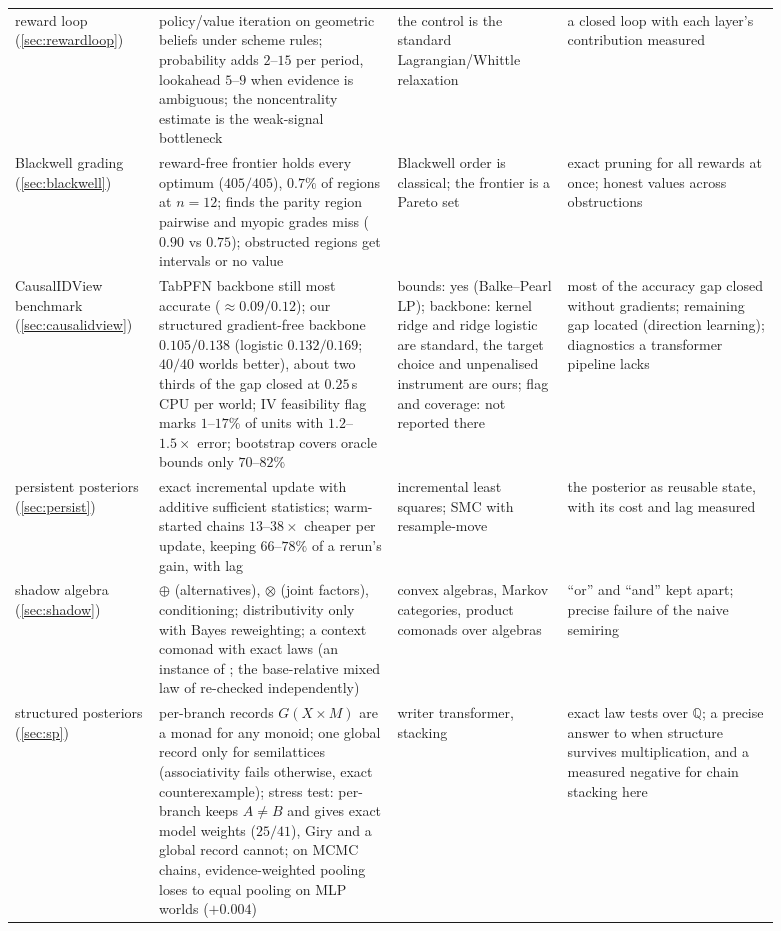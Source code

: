 \documentclass[11pt]{article}
\theoremstyle{definition}
\theoremstyle{remark}
\begin{document}
{\begin{longtable}{>{\raggedright\arraybackslash}p{0.15\linewidth}>{\raggedright\arraybackslash}p{0.29\linewidth}>{\raggedright\arraybackslash}p{0.2\linewidth}>{\raggedright\arraybackslash}p{0.25\linewidth}}
reward loop (\ref{sec:rewardloop}) & policy/value iteration on geometric beliefs under scheme rules; probability adds $2$--$15$ per period, lookahead $5$--$9$ when evidence is ambiguous; the noncentrality estimate is the weak-signal bottleneck & the control is the standard Lagrangian/Whittle relaxation & a closed loop with each layer's contribution measured\\
Blackwell grading (\ref{sec:blackwell}) & reward-free frontier holds every optimum ($405/405$), $0.7\%$ of regions at $n=12$; finds the parity region pairwise and myopic grades miss ($0.90$ vs $0.75$); obstructed regions get intervals or no value & Blackwell order is classical; the frontier is a Pareto set & exact pruning for all rewards at once; honest values across obstructions\\
CausalIDView benchmark (\ref{sec:causalidview}) & TabPFN backbone still most accurate ($\approx0.09/0.12$); our structured gradient-free backbone $0.105/0.138$ (logistic $0.132/0.169$; $40/40$ worlds better), about two thirds of the gap closed at $0.25$\,s CPU per world; IV feasibility flag marks $1$--$17\%$ of units with $1.2$--$1.5\times$ error; bootstrap covers oracle bounds only $70$--$82\%$ & bounds: yes (Balke--Pearl LP); backbone: kernel ridge and ridge logistic are standard, the target choice and unpenalised instrument are ours; flag and coverage: not reported there & most of the accuracy gap closed without gradients; remaining gap located (direction learning); diagnostics a transformer pipeline lacks\\
persistent posteriors (\ref{sec:persist}) & exact incremental update with additive sufficient statistics; warm-started chains $13$--$38\times$ cheaper per update, keeping $66$--$78\%$ of a rerun's gain, with lag & incremental least squares; SMC with resample-move & the posterior as reusable state, with its cost and lag measured\\
shadow algebra (\ref{sec:shadow}) & $\oplus$ (alternatives), $\otimes$ (joint factors), conditioning; distributivity only with Bayes reweighting; a context comonad with exact laws (an instance of \cite[Thm.~6.1]{awasthiT}; the base-relative mixed law of \cite[Thm.~9.8]{awasthiT} re-checked independently) & convex algebras, Markov categories, product comonads over algebras & ``or'' and ``and'' kept apart; precise failure of the naive semiring\\
structured posteriors (\ref{sec:sp}) & per-branch records $G(X\times M)$ are a monad for any monoid; one global record only for semilattices (associativity fails otherwise, exact counterexample); stress test: per-branch keeps $A\neq B$ and gives exact model weights ($25/41$), Giry and a global record cannot; on MCMC chains, evidence-weighted pooling loses to equal pooling on MLP worlds ($+0.004$) & writer transformer, stacking & exact law tests over $\mathbb Q$; a precise answer to when structure survives multiplication, and a measured negative for chain stacking here\\

\end{longtable}}
\end{document}
